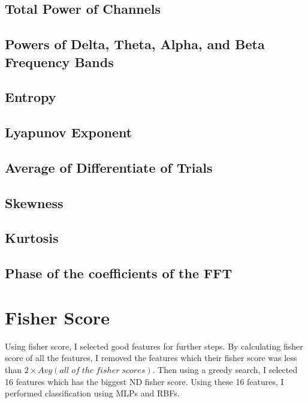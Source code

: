 \documentclass[a4paper, openany]{book}
\begin{document}
\subsection{Total Power of Channels}

\subsection{Powers of Delta, Theta, Alpha, and Beta Frequency Bands }

\subsection{Entropy}

\subsection{Lyapunov Exponent}

\subsection{Average of Differentiate of Trials}


\subsection{Skewness}

\subsection{Kurtosis}

\subsection{Phase of the coefficients of the FFT}

\newpage

\section{Fisher Score}
	\vspace{0.3cm}
	
Using fisher score, I selected good features for further steps. By calculating  fisher score of all the features, I removed the features which their fisher score was less than $2\times Avg(all\;of\;the\;fisher\;scores)$. Then using a greedy search, I selected 16 features which has the biggest ND fisher score. Using these 16 features, I performed classification using MLPs and RBFs.
\end{document}
